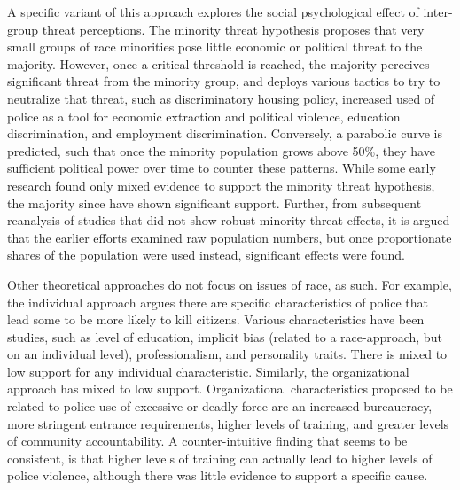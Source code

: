 \documentclass[sigconf]{acmart}
\begin{document}
A specific variant of this approach explores the social psychological effect of inter-group threat perceptions.  The minority threat hypothesis proposes that very small groups of race minorities pose little economic or political threat to the majority.  However, once a critical threshold is reached, the majority perceives significant threat from the minority group, and deploys various tactics to try to neutralize that threat, such as discriminatory housing policy, increased used of police as a tool for economic extraction and political violence, education discrimination, and employment discrimination. \cite{luders10} Conversely, a parabolic curve is predicted, such that once the minority population grows above 50\%, they have sufficient political power over time to counter these patterns. While some early research found only mixed evidence to support the minority threat hypothesis, the majority since have shown significant support. \cite{legewie15,smith04,smith14,holmes00,stults07,jacobs02,kent05,petro03}  Further, from subsequent reanalysis of studies that did not show robust minority threat effects, it is argued that the earlier efforts examined raw population numbers, but once proportionate shares of the population were used instead, significant effects were found. \cite{legewie15}

Other theoretical approaches do not focus on issues of race, as such.  For example, the individual approach argues there are specific characteristics of police that lead some to be more likely to kill citizens.  Various characteristics have been studies, such as level of education, implicit bias (related to a race-approach, but on an individual level), professionalism, and personality traits.  \cite{nix17,smith04}  There is mixed to low support for any individual characteristic.  Similarly, the organizational approach has mixed to low support.  Organizational characteristics proposed to be related to police use of excessive or deadly force are an increased bureaucracy, more stringent entrance requirements, higher levels of training, and greater levels of community accountability. \cite{nix17,smith04,smith14} A counter-intuitive finding that seems to be consistent, is that higher levels of training can actually lead to higher levels of police violence, although there was little evidence to support a specific cause.
\end{document}
